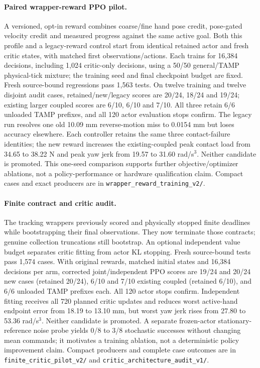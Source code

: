 \paragraph{Paired wrapper-reward PPO pilot.}
A versioned, opt-in reward combines coarse/fine hand pose credit, pose-gated
velocity credit and measured progress against the same active goal. Both this
profile and a legacy-reward control start from identical retained actor and
fresh critic states, with matched first observations/actions. Each trains for
16,384 decisions, including 1,024 critic-only decisions, using a 50/50
general/TAMP physical-tick mixture; the training seed and final checkpoint
budget are fixed. Fresh source-bound regressions pass 1,563 tests. On twelve
training and twelve disjoint audit cases, retained/new/legacy scores are
20/24, 18/24 and 19/24; existing larger coupled scores are 6/10, 6/10 and 7/10.
All three retain 6/6 unloaded TAMP prefixes, and all 120 actor evaluation stops
confirm. The legacy run resolves one old 10.09 mm reverse-motion miss to
0.0154 mm but loses accuracy elsewhere. Each controller retains the same three
contact-failure identities; the new reward increases the existing-coupled peak
contact load from 34.65 to 38.22 N and peak yaw jerk from 19.57 to
31.60 rad/s$^3$. Neither candidate is promoted. This one-seed comparison supports
further objective/optimizer ablations, not a policy-performance or hardware
qualification claim. Compact cases and exact producers are in
\texttt{wrapper\_reward\_training\_v2/}.


\paragraph{Finite contract and critic audit.}
The tracking wrappers previously scored and physically stopped finite deadlines
while bootstrapping their final observations. They now terminate those contracts;
genuine collection truncations still bootstrap. An optional independent value
budget separates critic fitting from actor KL stopping. Fresh source-bound tests
pass 1,574 cases. With original rewards, matched initial states and 16,384
decisions per arm, corrected joint/independent PPO scores are 19/24 and 20/24
new cases (retained 20/24), 6/10 and 7/10 existing coupled (retained 6/10),
and 6/6 unloaded TAMP prefixes each. All 120 actor stops confirm. Independent
fitting receives all 720 planned critic updates and reduces worst active-hand
endpoint error from 18.19 to 13.10 mm, but worst yaw jerk rises from 27.80 to
53.36 rad/s$^3$. Neither candidate is promoted. A separate frozen-actor
stationary-reference noise probe yields 0/8 to 3/8 stochastic successes without
changing mean commands; it motivates a training ablation, not a deterministic
policy improvement claim. Compact producers and complete case outcomes are in
\texttt{finite\_critic\_pilot\_v2/} and
\texttt{critic\_architecture\_audit\_v1/}.


